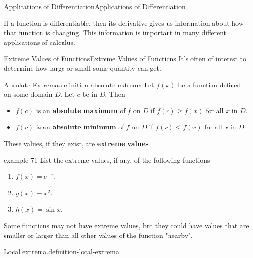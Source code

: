 \documentclass[10pt,]{book}
\newcommand{\terminology}[1]{\textbf{#1}}
\numberwithin{equation}{section}
\begin{document}
\begin{chapterptx}{Applications of Differentiation}{}{Applications of Differentiation}{}{}\label{applications-differentiation}
\begin{introduction}{}%
\hypertarget{p-308}{}%
If a function is differentiable, then its derivative gives us information about how that function is changing. This information is important in many different applications of calculus.%
\end{introduction}%
%
%
\typeout{************************************************}
\typeout{************************************************}
%
\begin{sectionptx}{Extreme Values of Functions}{}{Extreme Values of Functions}{}{}\label{section-extreme-values-of-functions}
\hypertarget{p-309}{}%
It's often of interest to determine how large or small some quantity can get.%
\begin{definition}{Absolute Extrema.}{definition-absolute-extrema}%
\hypertarget{p-310}{}%
Let \(f(x)\) be a function defined on some domain \(D\). Let \(c\) be in \(D\). Then \leavevmode%
\begin{itemize}[label=\textbullet]
\item{}\(f(c)\) is an \terminology{absolute maximum} of \(f\) on \(D\) if \(f(c)\geq f(x)\) for all \(x\) in \(D\).%
\item{}\(f(c)\) is an \terminology{absolute minimum} of \(f\) on \(D\) if \(f(c)\leq f(x)\) for all \(x\) in \(D\).%
\end{itemize}
 These values, if they exist, are \terminology{extreme values}.%
\end{definition}
\begin{example}{}{example-71}%
\hypertarget{p-311}{}%
List the extreme values, if any, of the following functions: \leavevmode%
\begin{enumerate}
\item\hypertarget{li-19}{}\(f(x) = e^{-x}\).%
\item\hypertarget{li-20}{}\(g(x) = x^{2}\).%
\item\hypertarget{li-21}{}\(h(x) = \sin x\).%
\end{enumerate}
%
\end{example}
\hypertarget{p-312}{}%
Some functions may not have extreme values, but they could have values that are smaller or larger than all other values of the function "nearby".%
\begin{definition}{Local extrema.}{definition-local-extrema}%

\end{definition}
\end{sectionptx}
\end{chapterptx}
\end{document}
